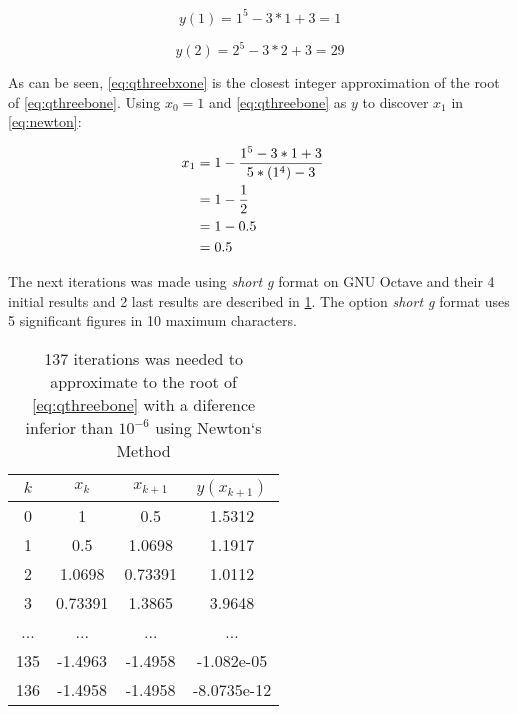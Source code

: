 		\begin{equation}
			y(1) = 1^5 - 3*1 + 3 = 1
		\label{eq:qthreebxone}
		\end{equation}

		\begin{equation}
			y(2) = 2^5 - 3*2 + 3 = 29
		\label{eq:qthreebxtwo}
		\end{equation}

		As can be seen, \cref{eq:qthreebxone} is the closest integer approximation of the root of \cref{eq:qthreebone}. Using $x_{0} = 1$ and \cref{eq:qthreebone} as $y$ to discover $x_{1}$ in \cref{eq:newton}:
	
		\begin{align}
			x_{1} &= 1 - \frac{1^5 - 3*1 + 3}{5*(1^4) - 3}& \notag \\
			&= 1 - \frac{1}{2}& \notag \\
			&= 1 - 0.5& \notag \\
			&= 0.5&
			\label{eq:qthreebxones}
		\end{align}

		The next iterations was made using \emph{short g} format on GNU Octave and their 4 initial results and 2 last results are described in \cref{tab:qthreeb}. The option \emph{short g} format uses 5 significant figures in 10 maximum characters.

		\begin{table}[H]
			\begin{center}
				\begin{tabular}{|c||c||c|c|}
					\hline
					\textbf{$k$} & \textbf{$x_{k}$} & \textbf{$x_{k+1}$} & \textbf{$y(x_{k+1})$} \\ \hline
					0 & 1 & 0.5 & 1.5312  \\ \hline
					1 & 0.5 & 1.0698 & 1.1917  \\ \hline
					2 & 1.0698 & 0.73391 & 1.0112  \\ \hline
					3 & 0.73391 & 1.3865 & 3.9648  \\ \hline
					... & ... & ... & ...  \\ \hline
					135 & -1.4963 & -1.4958 & -1.082e-05  \\ \hline
					136 & -1.4958 & -1.4958 & -8.0735e-12  \\ \hline
				\end{tabular}
				\caption{137 iterations was needed to approximate to the root of \cref{eq:qthreebone} with a diference inferior than $10^{-6}$ using Newton`s Method}
				\label{tab:qthreeb}
			\end{center}
		\end{table}